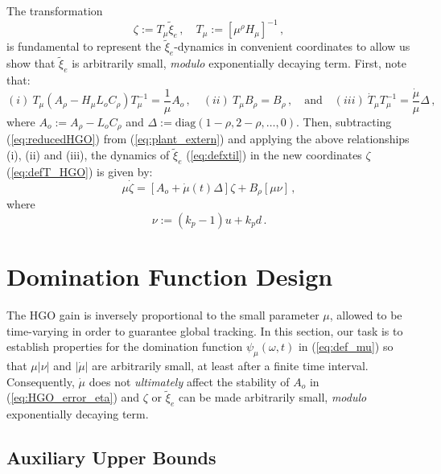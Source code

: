 \documentclass{rncauth}
\begin{document}
The transformation \cite{CHCL:2005}\cite{OK:97}
%
\begin{equation}
\zeta:=T_{\mu}\tilde{\xi}_e\,, \quad T_\mu:=[\mu^\rho
H_\mu]^{-1}\,,\label{eq:defT_HGO}
\end{equation}
%
is fundamental to represent the $\tilde{\xi}_e$-dynamics in
convenient coordinates to allow us show that $\tilde{\xi}_e$ is
arbitrarily small, {\em modulo} exponentially decaying term. First,
note that:
%
$$(i) \ T_\mu(A_\rho-H_\mu L_o
C_\rho)T_\mu^{-1}\!=\!\frac{1}{\mu}A_o\,, \quad (ii) \ T_\mu B_\rho\!=\!B_\rho\,, \quad \mbox{and} \quad
(iii) \ \dot{T}_\mu T_\mu^{-1}\!=\!\frac{\dot{\mu}}{\mu}
\Delta\,,$$
%
where $A_o\!:=\!A_\rho\!-\!L_o C_\rho$ and
$\Delta\!:=\!\mbox{diag}(1-\rho,2-\rho,\ldots,0)$.
%
Then, subtracting (\ref{eq:reducedHGO}) from
(\ref{eq:plant_extern}) and applying the above
relationships (i),
(ii) and (iii), the dynamics of $\tilde{\xi}_e$ (\ref{eq:defxtil})
in the new coordinates $\zeta$ (\ref{eq:defT_HGO}) is given by:
%
\begin{equation}
\mu \dot{\zeta} = [A_o+ \dot{\mu}(t) \Delta] \zeta + B_\rho [\mu
\nu]\,, \label{eq:HGO_error_eta}
\end{equation}
%
where %
%
\begin{equation}
\nu:=(k_p-1)u+k_p d\,.\label{eq:def_nu}
\end{equation}
%





\section{Domination Function Design \label{sec:HGOdesign}}

The HGO gain is inversely proportional to the small parameter $\mu$,
allowed to be time-varying in order to guarantee global tracking. In
this section, our task is to establish properties for the domination
function $\psi_\mu(\omega,t)$ in (\ref{eq:def_mu}) so that $\mu
|\nu|$ and $|\dot{\mu}|$ are arbitrarily small, at least after a
finite time interval. Consequently, $\dot{\mu}$ does not {\em
ultimately} affect the stability of $A_o$ in
(\ref{eq:HGO_error_eta}) and $\zeta$ or $\tilde{\xi}_e$ can be made
arbitrarily small, {\em modulo} exponentially decaying term.

\subsection{Auxiliary Upper Bounds}
\end{document}

